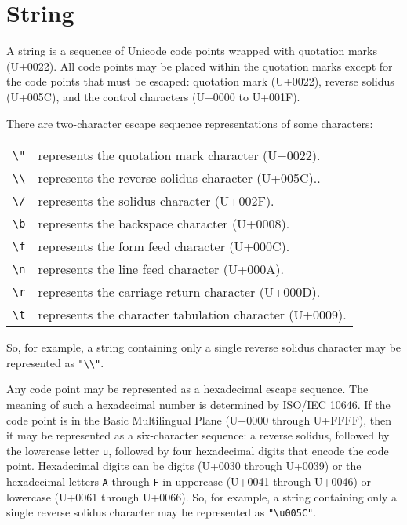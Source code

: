 
\section{String}

A string is a sequence of Unicode code points wrapped with quotation marks (U+0022).
All code points may be placed within the quotation marks except for the code points that must be escaped: quotation mark (U+0022), reverse solidus (U+005C), and the control characters (U+0000 to U+001F).

There are two-character escape sequence representations of some characters:

\begin{table*}[htp]
	\begin{tabular}{ll}
		\texttt{\textbackslash"} & represents the quotation mark character (U+0022). \\
		\texttt{\textbackslash\textbackslash} & represents the reverse solidus character (U+005C).. \\
		\texttt{\textbackslash/} & represents the solidus character (U+002F). \\
		\texttt{{\textbackslash}b} & represents the backspace character (U+0008). \\
		\texttt{{\textbackslash}f} & represents the form feed character (U+000C). \\
		\texttt{{\textbackslash}n} & represents the line feed character (U+000A). \\
		\texttt{{\textbackslash}r} & represents the carriage return character (U+000D). \\
		\texttt{{\textbackslash}t} & represents the character tabulation character (U+0009). \\
	\end{tabular}
\end{table*}

So, for example, a string containing only a single reverse solidus character may be represented as \texttt{"\textbackslash\textbackslash"}.

Any code point may be represented as a hexadecimal escape sequence.
The meaning of such a hexadecimal number is determined by ISO/IEC 10646.
If the code point is in the Basic Multilingual Plane (U+0000 through U+FFFF), then it may be represented as a six-character sequence: a reverse solidus, followed by the lowercase letter \texttt{u}, followed by four hexadecimal digits that encode the code point.
Hexadecimal digits can be digits (U+0030 through U+0039) or the hexadecimal letters \texttt{A} through \texttt{F} in uppercase (U+0041 through U+0046) or lowercase (U+0061 through U+0066).
So, for example, a string containing only a single reverse solidus character may be represented as \texttt{"{\textbackslash}u005C"}.

